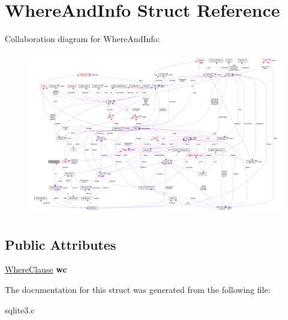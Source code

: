 \hypertarget{structWhereAndInfo}{}\section{Where\+And\+Info Struct Reference}
\label{structWhereAndInfo}


Collaboration diagram for Where\+And\+Info\+:\nopagebreak
\begin{figure}[H]
\begin{center}
\leavevmode
\includegraphics[width=350pt]{structWhereAndInfo__coll__graph}
\end{center}
\end{figure}
\subsection*{Public Attributes}
\begin{DoxyCompactItemize}
\item 
\hyperlink{structWhereClause}{Where\+Clause} {\bfseries wc}\hypertarget{structWhereAndInfo_a01cea99f069b1e598004a1cd0d0c3a80}{}\label{structWhereAndInfo_a01cea99f069b1e598004a1cd0d0c3a80}

\end{DoxyCompactItemize}


The documentation for this struct was generated from the following file\+:\begin{DoxyCompactItemize}
\item 
sqlite3.\+c\end{DoxyCompactItemize}
